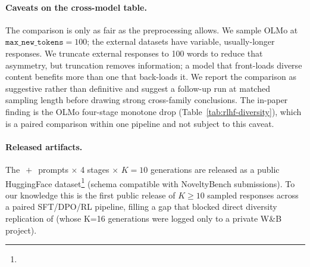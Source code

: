 \paragraph{Caveats on the cross-model table.} The comparison is only as fair as the preprocessing allows. We sample OLMo at $\texttt{max\_new\_tokens}{=}100$; the external datasets have variable, usually-longer responses. We truncate external responses to 100 words to reduce that asymmetry, but truncation removes information; a model that front-loads diverse content benefits more than one that back-loads it. We report the comparison as suggestive rather than definitive and suggest a follow-up run at matched sampling length before drawing strong cross-family conclusions. The in-paper finding is the OLMo four-stage monotone drop (Table~\ref{tab:rlhf-diversity}), which is a paired comparison within one pipeline and not subject to this caveat.

\paragraph{Released artifacts.} The \olmoAlpacaN$\,+\,$\olmoNbCuratedN{} prompts $\times$ 4 stages $\times$ $K{=}10$ generations are released as a public HuggingFace dataset\footnote{\projectHfDatasetUrl} (schema compatible with NoveltyBench submissions). To our knowledge this is the first public release of $K\!\ge\!10$ sampled responses across a paired SFT/DPO/RL pipeline, filling a gap that blocked direct diversity replication of \citet{kirk2023rlhf} (whose K=16 generations were logged only to a private W\&B project).

\providecommand{\olmoAlpacaN}{200}
\providecommand{\olmoNbCuratedN}{100}
\providecommand{\olmoAlpacaBaseDMean}{??}
\providecommand{\olmoAlpacaSftDMean}{??}
\providecommand{\olmoAlpacaDpoDMean}{??}
\providecommand{\olmoAlpacaInstructDMean}{??}
\providecommand{\olmoAlpacaHoneADz}{??}
\providecommand{\olmoAlpacaHoneAPbonf}{??}
\providecommand{\olmoAlpacaHoneBDz}{??}
\providecommand{\olmoAlpacaHoneBPbonf}{??}
\providecommand{\olmoAlpacaHoneCDz}{??}
\providecommand{\olmoAlpacaHoneCPbonf}{??}
\providecommand{\olmoAlpacaHpaDiff}{??}
\providecommand{\olmoAlpacaHpaDz}{??}
\providecommand{\olmoNbCuratedBaseDMean}{??}
\providecommand{\olmoNbCuratedSftDMean}{??}
\providecommand{\olmoNbCuratedDpoDMean}{??}
\providecommand{\olmoNbCuratedInstructDMean}{??}
\providecommand{\olmoNbCuratedHoneADz}{??}
\providecommand{\olmoNbCuratedHoneAPbonf}{??}
\providecommand{\olmoNbCuratedHoneBDz}{??}
\providecommand{\olmoNbCuratedHoneBPbonf}{??}
\providecommand{\olmoNbCuratedHoneCDz}{??}
\providecommand{\olmoNbCuratedHoneCPbonf}{??}

